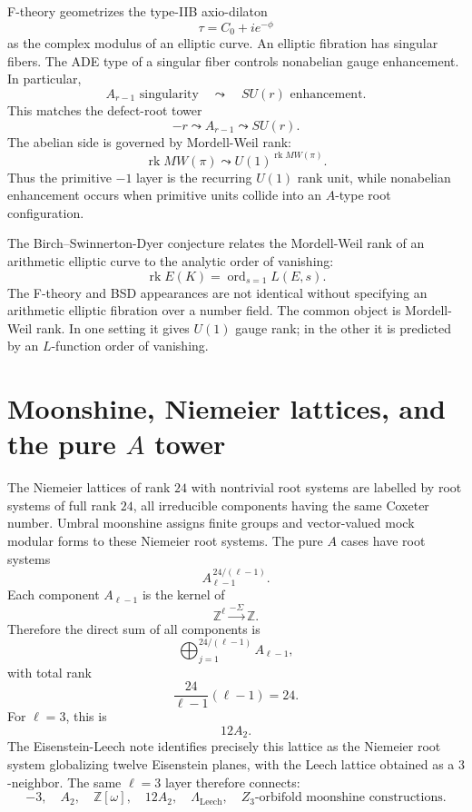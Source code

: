 \documentclass[11pt]{article}
\newcommand{\ZZ}{\mathbb Z}
\begin{document}
F-theory geometrizes the type-IIB axio-dilaton
\[
        \tau=C_0+ie^{-\phi}
\]
as the complex modulus of an elliptic curve.  An elliptic fibration has singular fibers.  The ADE type of a singular fiber controls nonabelian gauge enhancement.  In particular,
\[
        A_{r-1}\text{ singularity}\quad\leadsto\quad SU(r)\text{ enhancement}.
\]
This matches the defect-root tower
\[
        -r\leadsto A_{r-1}\leadsto SU(r).
\]
The abelian side is governed by Mordell-Weil rank:
\[
        \operatorname{rk}MW(\pi)\leadsto U(1)^{\operatorname{rk}MW(\pi)}.
\]
Thus the primitive $-1$ layer is the recurring $U(1)$ rank unit, while nonabelian enhancement occurs when primitive units collide into an $A$-type root configuration.

The Birch--Swinnerton-Dyer conjecture relates the Mordell-Weil rank of an arithmetic elliptic curve to the analytic order of vanishing:
\[
        \operatorname{rk}E(K)=\operatorname{ord}_{s=1}L(E,s).
\]
The F-theory and BSD appearances are not identical without specifying an arithmetic elliptic fibration over a number field.  The common object is Mordell-Weil rank.  In one setting it gives $U(1)$ gauge rank; in the other it is predicted by an $L$-function order of vanishing.

\section{Moonshine, Niemeier lattices, and the pure $A$ tower}

The Niemeier lattices of rank $24$ with nontrivial root systems are labelled by root systems of full rank $24$, all irreducible components having the same Coxeter number.  Umbral moonshine assigns finite groups and vector-valued mock modular forms to these Niemeier root systems.  The pure $A$ cases have root systems
\[
        A_{\ell-1}^{\,24/(\ell-1)}.
\]
Each component $A_{\ell-1}$ is the kernel of
\[
        \ZZ^\ell\xrightarrow{-\Sigma}\ZZ.
\]
Therefore the direct sum of all components is
\[
        \bigoplus_{j=1}^{24/(\ell-1)} A_{\ell-1},
\]
with total rank
\[
        \frac{24}{\ell-1}(\ell-1)=24.
\]
For $\ell=3$, this is
\[
        12A_2.
\]
The Eisenstein-Leech note identifies precisely this lattice as the Niemeier root system globalizing twelve Eisenstein planes, with the Leech lattice obtained as a $3$-neighbor.  The same $\ell=3$ layer therefore connects:
\[
        -3,
        \quad A_2,
        \quad \ZZ[\omega],
        \quad 12A_2,
        \quad \Lambda_{\mathrm{Leech}},
        \quad Z_3\text{-orbifold moonshine constructions}.
\]
\end{document}
